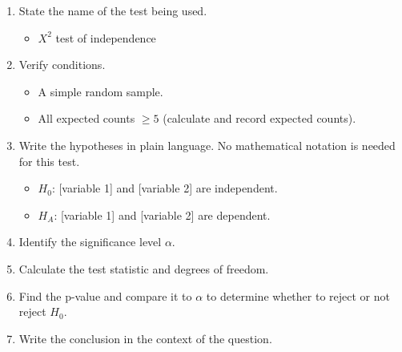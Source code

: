 \begin{termBox}{
\begin{enumerate}
\setlength{\itemsep}{0mm}
\item State the name of the test being used.\vspace{-2mm}
\begin{itemize}
\setlength{\itemsep}{0mm}
\item $X^2$ test of independence
\end{itemize}
\item Verify conditions.\vspace{-2mm}
\begin{itemize}
\setlength{\itemsep}{0mm}
\item A simple random sample.
\item All expected counts $\ge 5$ (calculate and record expected counts).
\end{itemize}
\item Write the hypotheses in plain language. No mathematical notation is needed for this test.\vspace{-2mm}
\begin{itemize}
\item $H_0$: [variable 1] and [variable 2] are independent.
\item $H_A$: [variable 1] and [variable 2] are dependent.
\end{itemize}
\item Identify the significance level $\alpha$.
\item Calculate the test statistic and degrees of freedom.%
\item Find the p-value and compare it to $\alpha$ to determine whether to reject or not reject $H_0$.
\item Write the conclusion in the context of the question.
\end{enumerate}}
\end{termBox}


